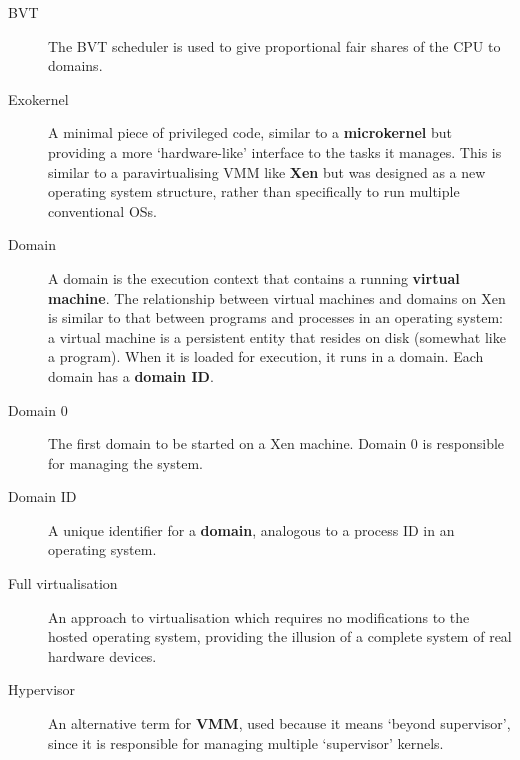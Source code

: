 \documentclass[11pt,twoside,final,openright]{report}
\begin{document}
{\begin{description}
\item[BVT]                 The BVT scheduler is used to give proportional
                           fair shares of the CPU to domains.

\item[Exokernel]           A minimal piece of privileged code, similar to
                           a {\bf microkernel} but providing a more
                           `hardware-like' interface to the tasks it
                           manages.  This is similar to a paravirtualising
                           VMM like {\bf Xen} but was designed as a new
                           operating system structure, rather than
                           specifically to run multiple conventional OSs.

\item[Domain]              A domain is the execution context that
                           contains a running {\bf virtual machine}.
                           The relationship between virtual machines
                           and domains on Xen is similar to that between
                           programs and processes in an operating
                           system: a virtual machine is a persistent
                           entity that resides on disk (somewhat like
                           a program).  When it is loaded for execution,
                           it runs in a domain.  Each domain has a
                           {\bf domain ID}.

\item[Domain 0]            The first domain to be started on a Xen
                           machine.  Domain 0 is responsible for managing
                           the system.

\item[Domain ID]           A unique identifier for a {\bf domain},
                           analogous to a process ID in an operating
                           system.

\item[Full virtualisation] An approach to virtualisation which
                           requires no modifications to the hosted
                           operating system, providing the illusion of
                           a complete system of real hardware devices.

\item[Hypervisor]          An alternative term for {\bf VMM}, used
                           because it means `beyond supervisor',
                           since it is responsible for managing multiple
                           `supervisor' kernels.


\end{description}}
\end{document}
